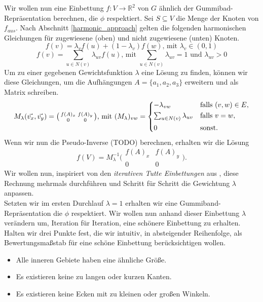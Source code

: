 Wir wollen nun eine Einbettung $f:V\to \mathbb{R}^2$ von $G$ ähnlich der Gummibad-Repräsentation berechnen, die $\phi$ respektiert. Sei $S \subseteq V$ die Menge der Knoten von $f_{aus}$. Nach Abschnitt \ref{harmonic_approach} gelten die folgenden harmonischen Gleichungen für zugewiesene (oben) und nicht zugewiesene (unten) Knoten.
$$ f(v) = \lambda_v f(u) + (1-\lambda_v)f(w) \text{, mit } \lambda_v \in (0,1) $$
$$ f(v) = \sum_{u \in N(v)} \lambda_{uv} f(u) \text{, mit }  \sum_{u \in N(v)}\lambda_{uv} = 1 \text{ und } \lambda_{uv} > 0 $$
Um zu einer gegebenen Gewichtsfunktion $\lambda$ eine Lösung zu finden, können wir diese Gleichungen, um die Aufhängungen $A = \{a_1,a_2,a_3\}$ erweitern und als Matrix schreiben.
\[ M_{\lambda}(\vec{v_x},\vec{v_y}) = \big( \begin{smallmatrix}f(A)_x&f(A)_y\\ 0&0\end{smallmatrix} \big) \text{, mit } (M_{\lambda})_{vw} =
	\begin{dcases}
	-\lambda_{vw} & \text{falls } (v,w) \in E, \\
	\textstyle\sum_{u \in N(v)} \lambda_{uv} & \text{falls } v = w, \\
	0 & \text{sonst.} \\
	\end{dcases}
\]
Wenn wir nun die Pseudo-Inverse (TODO) berechnen, erhalten wir die Lösung
$$f(V) = M_{\lambda}^{-1}\big( \begin{smallmatrix}f(A)_x&f(A)_y\\ 0&0\end{smallmatrix} \big).$$
Wir wollen nun, inspiriert von den \textit{iterativen Tutte Einbettungen} aus \cite{fs17}, diese Rechnung mehrmals durchführen und Schritt für Schritt die Gewichtung $\lambda$ anpassen.\\

Setzten wir im ersten Durchlauf $\lambda = 1$ erhalten wir eine Gummiband-Repräsentation die $\phi$ respektiert. Wir wollen nun anhand dieser Einbettung $\lambda$ verändern um, Iteration für Iteration, eine \glqq schönere\grqq{ } Einbettung zu erhalten. Halten wir drei Punkte fest, die wir intuitiv, in absteigender Reihenfolge, als Bewertungsmaßstab für eine schöne Einbettung berücksichtigen wollen.
\begin{itemize}
\item Alle inneren Gebiete haben eine ähnliche Größe.
\item Es existieren keine zu langen oder kurzen Kanten.
\item Es existieren keine Ecken mit zu kleinen oder großen Winkeln.
\end{itemize}

